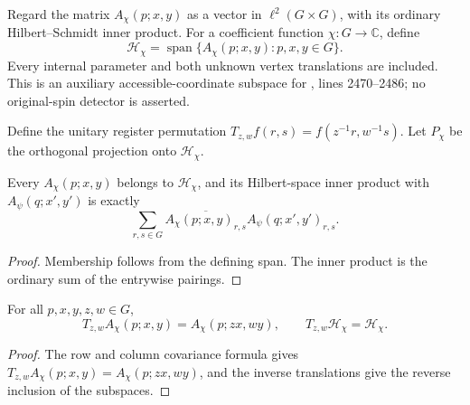 \begin{definition}
    \label{def:peps_regular_charge_subspace}
    \leanok
    Regard the matrix $A_\chi(p;x,y)$ as a vector in
    $\ell^2(G\times G)$, with its ordinary Hilbert--Schmidt inner product.
    For a coefficient function $\chi:G\to\mathbb C$, define
    \[
        \mathcal H_\chi
        =\operatorname{span}\{A_\chi(p;x,y):p,x,y\in G\}.
    \]
    Every internal parameter and both unknown vertex translations are included.
    This is an auxiliary accessible-coordinate subspace for
    \cite[charge detection]{Schuch2010PEPS}, lines 2470--2486;
    no original-spin detector is asserted.
\end{definition}

\begin{definition}
    \label{def:peps_regular_charge_translation_detector}
    \leanok
    Define the unitary register permutation
    $T_{z,w}f(r,s)=f(z^{-1}r,w^{-1}s)$.
    Let $P_\chi$ be the orthogonal projection onto $\mathcal H_\chi$.
\end{definition}

\begin{lemma}
    \label{thm:peps_regular_charge_subspace_vectors}
    \leanok
    Every $A_\chi(p;x,y)$ belongs to $\mathcal H_\chi$, and its
    Hilbert-space inner product with $A_\psi(q;x',y')$ is exactly
    \[
        \sum_{r,s\in G}\overline{A_\chi(p;x,y)_{r,s}}
        A_\psi(q;x',y')_{r,s}.
    \]
\end{lemma}
\begin{proof}\leanok
    Membership follows from the defining span. The inner product is the
    ordinary sum of the entrywise pairings.
\end{proof}

\begin{lemma}
    \label{thm:peps_regular_charge_subspace_translation}
    \leanok
    For all $p,x,y,z,w\in G$,
    \[
        T_{z,w}A_\chi(p;x,y)=A_\chi(p;zx,wy),
        \qquad T_{z,w}\mathcal H_\chi=\mathcal H_\chi.
    \]
\end{lemma}
\begin{proof}\leanok
    The row and column covariance formula gives
    $T_{z,w}A_\chi(p;x,y)=A_\chi(p;zx,wy)$, and the inverse
    translations give the reverse inclusion of the subspaces.
\end{proof}

